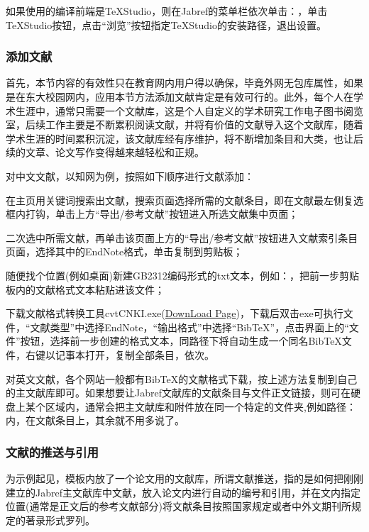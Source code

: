 如果使用的编译前端是\TeX{}Studio，则在Jabref的菜单栏依次单击：，单击\TeX{}Studio按钮，点击“浏览”按钮指定\TeX{}Studio的安装路径，退出设置。
\subsubsection{添加文献}
首先，本节内容的有效性只在教育网内用户得以确保，毕竟外网无包库属性，如果是在东大校园网内，应用本节方法添加文献肯定是有效可行的。此外，每个人在学术生涯中，通常只需要一个文献库，这是个人自定义的学术研究工作电子图书阅览室，后续工作主要是不断累积阅读文献，并将有价值的文献导入这个文献库，随着学术生涯的时间累积沉淀，该文献库经有序维护，将不断增加条目和大类，也让后续的文章、论文写作变得越来越轻松和正规。

对中文文献，以知网为例，按照如下顺序进行文献添加：
\begin{asparaenum}
	\item 在主页用关键词搜索出文献，搜索页面选择所需的文献条目，即在文献最左侧复选框内打钩，单击上方“导出/参考文献”按钮进入所选文献集中页面；
	\item 二次选中所需文献，再单击该页面上方的“导出/参考文献”按钮进入文献索引条目页面，选择其中的EndNote格式，单击复制到剪贴板；
	\item 随便找个位置(例如桌面)新建GB2312编码形式的txt文本，例如：，把前一步剪贴板内的文献格式文本粘贴进该文件；
	\item 下载文献格式转换工具cvtCNKI.exe(\href{https://code.google.com/archive/p/cvtcnki/downloads}{DownLoad Page})，下载后双击exe可执行文件，“文献类型”中选择EndNote，“输出格式”中选择“Bib\TeX ”，点击界面上的“文件”按钮，选择前一步创建的格式文本，同路径下将自动生成一个同名Bib\TeX 文件，右键以记事本打开，复制全部条目，依次。
\end{asparaenum}

对英文文献，各个网站一般都有Bib\TeX 的文献格式下载，按上述方法复制到自己的主文献库即可。如果想要让Jabref文献库的文献条目与文件正文链接，则可在硬盘上某个区域内，通常会把主文献库和附件放在同一个特定的文件夹,例如路径：内，在文献条目上，其余就不用多说了。

\subsubsection{文献的推送与引用}
为示例起见，模板内放了一个论文用的文献库，所谓文献推送，指的是如何把刚刚建立的Jabref主文献库中文献，放入论文内进行自动的编号和引用，并在文内指定位置(通常是正文后的参考文献部分)将文献条目按照国家规定或者中外文期刊所规定的著录形式罗列。

